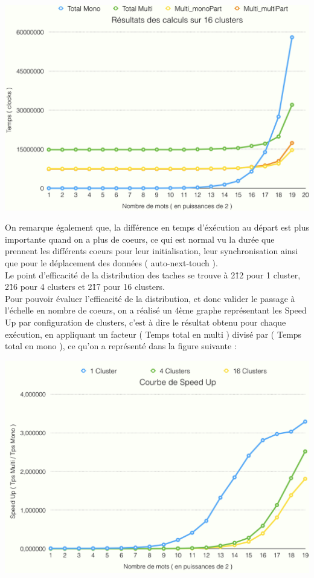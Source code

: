 \begin{center}
\includegraphics[scale=0.4]{images/graph_16.png}
\end{center}

On remarque également que, la différence en temps d'éxécution au départ est plus importante quand on a plus de coeurs, ce qui est normal vu la durée que prennent les différents coeurs pour leur initialisation, leur synchronisation ainsi que pour le déplacement des données ( auto-next-touch ).\\
Le point d'efficacité de la distribution des taches se trouve à 2\^12 pour 1 cluster, 2\^16 pour 4 clusters et 2\^17 pour 16 clusters.\\

Pour pouvoir évaluer l'efficacité de la distribution, et donc valider le passage à l'échelle en nombre de coeurs, on a réalisé un 4ème graphe représentant les Speed Up par configuration de clusters, c'est à dire le résultat obtenu pour chaque exécution, en appliquant un facteur ( Temps total en multi ) divisé par ( Temps total en mono ), ce qu'on a représenté dans la figure suivante :\\

\begin{center}
\includegraphics[scale=0.4]{images/graph_speedup.png}
\end{center}

